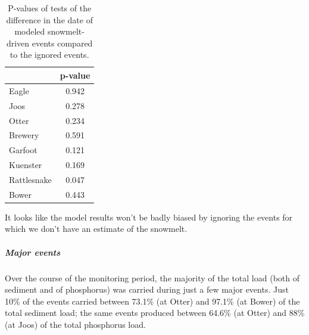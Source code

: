 \documentclass[10pt]{article}
\begin{document}
\begin{table}[ht]
\begin{center}
\begin{tabular}{lc}
  & p-value \\ 
  \hline
Eagle & 0.942 \\ 
  Joos & 0.278 \\ 
  Otter & 0.234 \\ 
  Brewery & 0.591 \\ 
  Garfoot & 0.121 \\ 
  Kuenster & 0.169 \\ 
  Rattlesnake & 0.047 \\ 
  Bower & 0.443 \\ 
  \end{tabular}
\caption{P-values of tests of the difference in the date of modeled snowmelt-driven events compared to the ignored events.}
\label{tab:ignored_test2}
\end{center}
\end{table}
It looks like the model results won't be badly biased by ignoring the events for which we don't have an estimate of the snowmelt.\\

\subparagraph{Major events}
Over the course of the monitoring period, the majority of the total load (both of sediment and of phosphorus) was carried during just a few major events. Just 10\% of the events carried between 73.1\% (at Otter) and 97.1\% (at Bower) of the total sediment load; the same events produced between 64.6\% (at Otter) and 88\% (at Joos) of the total phosphorus load.\\
\end{document}
